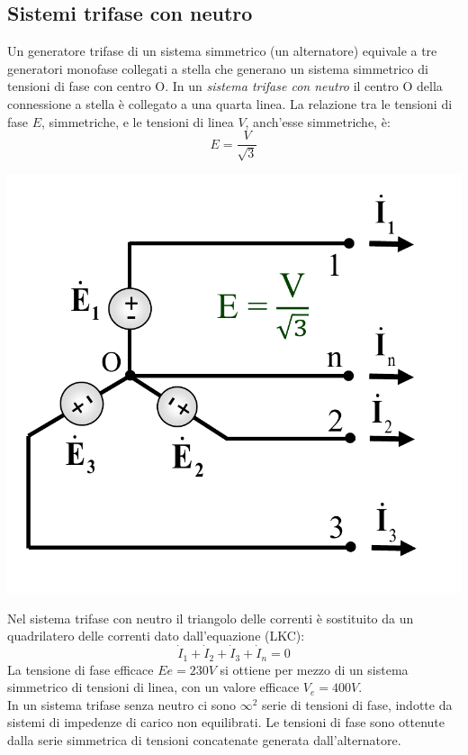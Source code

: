 \documentclass{article}
\begin{document}
\subsection{Sistemi trifase con neutro}
Un generatore trifase di un sistema
simmetrico (un alternatore) equivale a tre
generatori monofase collegati a stella che
generano un sistema simmetrico di tensioni di
fase con centro O. In un \textit{sistema trifase con
neutro} il centro O della connessione a stella è
collegato a una quarta linea. La relazione tra
le tensioni di fase $E$, simmetriche, e le tensioni
di linea $V$, anch'esse simmetriche, è:
\[E = \frac{V}{\sqrt{3}}\]
\begin{center}
    \includegraphics[scale=0.27]{Image/Sistemi_trifase_neutro_1.png}
\end{center}
Nel sistema trifase con neutro il triangolo
delle correnti è sostituito da un quadrilatero
delle correnti dato dall'equazione (LKC):
\[\dot I_1 + \dot I_2 + \dot I_3 + \dot I_n =0\]
La tensione di fase efficace $Ee = 230 V$ si ottiene per mezzo di un sistema simmetrico di tensioni di linea, con un valore efficace $V_e = 400 V$.
\vspace*{0.2cm}\\
In un sistema trifase senza neutro ci
sono $\infty^2$ serie di tensioni di fase, indotte da sistemi di impedenze di carico non
equilibrati. Le tensioni di fase sono ottenute dalla serie simmetrica di tensioni
concatenate generata dall'alternatore.
\end{document}
